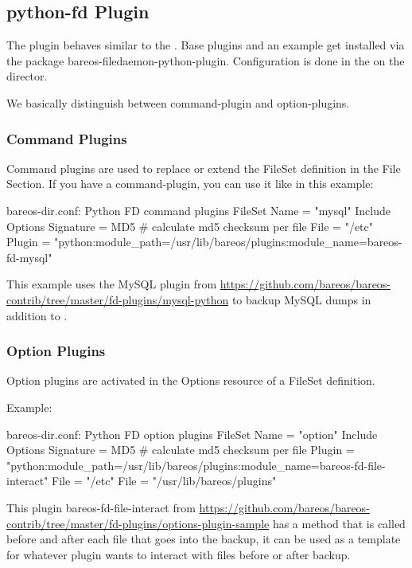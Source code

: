 \subsection{python-fd Plugin}

The  plugin behaves similar to the . Base plugins and an example get installed via the package bareos-filedaemon-python-plugin.
Configuration is done in the  on the director.

We basically distinguish between command-plugin and option-plugins. 

\subsubsection{Command Plugins}
Command plugins are used to replace or extend the FileSet definition in the File Section. If you have a command-plugin, 
you can use it like in this example:

\begin{bconfig}{bareos-dir.conf: Python FD command plugins}
FileSet {
  Name = "mysql"
  Include {
    Options {
      Signature = MD5 # calculate md5 checksum per file
    }
    File = "/etc"
    Plugin = "python:module_path=/usr/lib/bareos/plugins:module_name=bareos-fd-mysql"
  }
} 
\end{bconfig}

This example uses the MySQL plugin from \url{https://github.com/bareos/bareos-contrib/tree/master/fd-plugins/mysql-python} to backup MySQL dumps in addition to .

\subsubsection{Option Plugins}
Option plugins are activated in the Options resource of a FileSet definition.

Example:

\begin{bconfig}{bareos-dir.conf: Python FD option plugins}
FileSet {
  Name = "option"
  Include {
    Options {
      Signature = MD5 # calculate md5 checksum per file
      Plugin = "python:module_path=/usr/lib/bareos/plugins:module_name=bareos-fd-file-interact"
    }
    File = "/etc"
    File = "/usr/lib/bareos/plugins"
  }
}
\end{bconfig}

This plugin bareos-fd-file-interact from \url{https://github.com/bareos/bareos-contrib/tree/master/fd-plugins/options-plugin-sample} has a method that is called before and after each file that goes into the backup,
it can be used as a template for whatever plugin wants to interact with files before or after backup.

